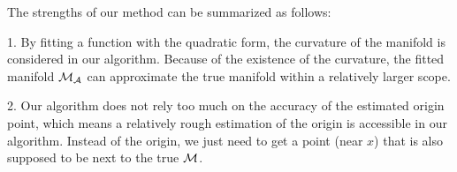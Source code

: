 \documentclass{article}
\theoremstyle{remark}
\begin{document}
The strengths of our method can be summarized as follows:

1. By fitting a function with the quadratic form, the curvature of the manifold is considered in our algorithm. Because of the existence of the curvature, the fitted manifold ${\cal M}_{\cal A}$ can approximate the true manifold within a relatively larger scope.

2. Our algorithm does not rely too much on the accuracy of the estimated origin point, which means a relatively rough estimation of the origin is accessible in our algorithm. Instead of the origin, we just need to get a point (near $x$) that is also supposed to be next to the true $\cal M$.
\end{document}
